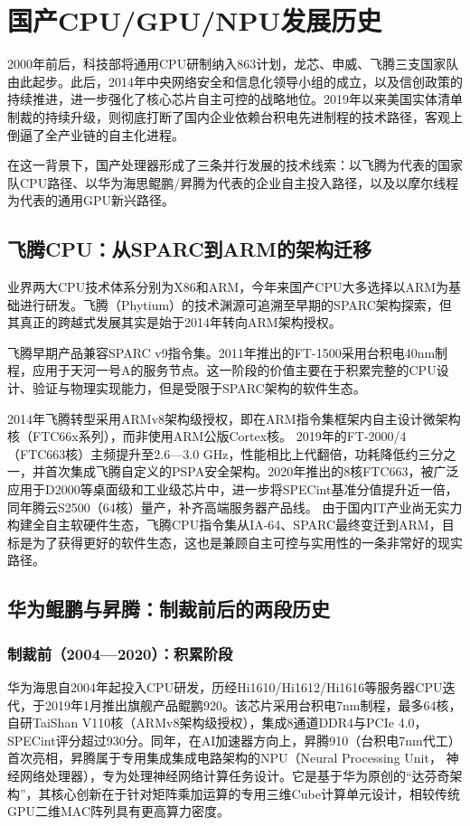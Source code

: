 \documentclass[a4paper]{article}
\begin{document}
\section{国产CPU/GPU/NPU发展历史}
2000年前后，科技部将通用CPU研制纳入863计划，龙芯、申威、飞腾三支国家队由此起步。此后，2014年中央网络安全和信息化领导小组的成立，以及信创政策的持续推进，进一步强化了核心芯片自主可控的战略地位。2019年以来美国实体清单制裁的持续升级，则彻底打断了国内企业依赖台积电先进制程的技术路径，客观上倒逼了全产业链的自主化进程。

在这一背景下，国产处理器形成了三条并行发展的技术线索：以飞腾为代表的国家队CPU路径、以华为海思鲲鹏/昇腾为代表的企业自主投入路径，以及以摩尔线程为代表的通用GPU新兴路径。
\subsection{飞腾CPU：从SPARC到ARM的架构迁移}
业界两大CPU技术体系分别为X86和ARM，今年来国产CPU大多选择以ARM为基础进行研发。飞腾（Phytium）的技术渊源可追溯至早期的SPARC架构探索，但其真正的跨越式发展其实是始于2014年转向ARM架构授权。

飞腾早期产品兼容SPARC v9指令集。2011年推出的FT-1500采用台积电40nm制程，应用于天河一号A的服务节点。这一阶段的价值主要在于积累完整的CPU设计、验证与物理实现能力，但是受限于SPARC架构的软件生态。

2014年飞腾转型采用ARMv8架构级授权，即在ARM指令集框架内自主设计微架构核（FTC66x系列），而非使用ARM公版Cortex核。
2019年的FT-2000/4（FTC663核）主频提升至2.6—3.0 GHz，性能相比上代翻倍，功耗降低约三分之一，并首次集成飞腾自定义的PSPA安全架构。2020年推出的8核FTC663，被广泛应用于D2000等桌面级和工业级芯片中，进一步将SPECint基准分值提升近一倍，同年腾云S2500（64核）量产，补齐高端服务器产品线。
由于国内IT产业尚无实力构建全自主软硬件生态，飞腾CPU指令集从IA-64、SPARC最终变迁到ARM，目标是为了获得更好的软件生态，这也是兼顾自主可控与实用性的一条非常好的现实路径。

\subsection{华为鲲鹏与昇腾：制裁前后的两段历史}
\subsubsection{制裁前（2004—2020）：积累阶段}
华为海思自2004年起投入CPU研发，历经Hi1610/Hi1612/Hi1616等服务器CPU迭代，于2019年1月推出旗舰产品鲲鹏920。该芯片采用台积电7nm制程，最多64核，自研TaiShan V110核（ARMv8架构级授权），集成8通道DDR4与PCIe 4.0，SPECint评分超过930分。同年，在AI加速器方向上，昇腾910（台积电7nm代工）首次亮相，昇腾属于专用集成集成电路架构的NPU（Neural Processing Unit， 神经网络处理器），专为处理神经网络计算任务设计。它是基于华为原创的“达芬奇架构”，其核心创新在于针对矩阵乘加运算的专用三维Cube计算单元设计，相较传统GPU二维MAC阵列具有更高算力密度。
\end{document}
